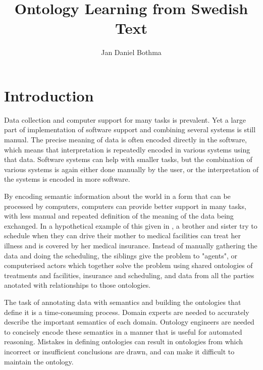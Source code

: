 \documentclass[a4paper]{report}
\title{Ontology Learning from Swedish Text}
\author{Jan Daniel Bothma}
\begin{document}
\maketitle

\begin{abstract}
\end{abstract}	

\tableofcontents

\chapter{Introduction}

Data collection and computer support for many tasks is prevalent.
Yet a large part of implementation of software support and combining several systems is still manual.
The precise meaning of data is often encoded directly in the software, which means that interpretation is repeatedly encoded in various systems using that data.
Software systems can help with smaller tasks, but the combination of various systems is again either done manually by the user, or the interpretation of the systems is encoded in more software.

By encoding semantic information about the world in a form that can be processed by computers, computers can provide better support in many tasks, with less manual and repeated definition of the meaning of the data being exchanged.
In a hypothetical example of this given in \cite{TBL01SciAm}, a brother and sister try to schedule when they can drive their mother to medical facilities can treat her illness and is covered by her medical insurance.
Instead of manually gathering the data and doing the scheduling, the siblings give the problem to "agents", or computerised actors which together solve the problem using shared ontologies of treatments and facilities, insurance and scheduling, and data from all the parties anotated with relationships to those ontologies.

The task of annotating data with semantics and building the ontologies that define it is a time-consuming process.
Domain experts are needed to accurately describe the important semantics of each domain.
Ontology engineers are needed to concisely encode these semantics in a manner that is useful for automated reasoning.
Mistakes in defining ontologies can result in ontologies from which incorrect or insufficient conclusions are drawn, and can make it difficult to maintain the ontology.
\end{document}
